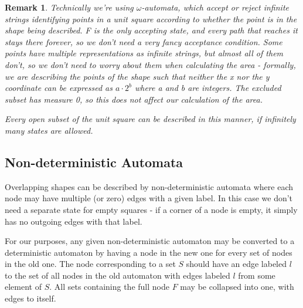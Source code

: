 \documentclass{article}
\newtheorem*{remark}{Remark}
\begin{document}
\begin{remark}
	Technically we're using $\omega$-automata, which accept or reject infinite strings identifying points in a unit square according to whether the point is in the shape being described.
	F is the only accepting state, and every path that reaches it stays there forever, so we don't need a very fancy acceptance condition.
	Some points have multiple representations as infinite strings, but almost all of them don't, so we don't need to worry about them when calculating the area - formally, we are describing the points of the shape such that neither the x nor the y coordinate can be expressed as $a \cdotp 2^b$ where a and b are integers. The excluded subset has measure 0, so this does not affect our calculation of the area.
	
	Every open subset of the unit square can be described in this manner, if infinitely many states are allowed.
\end{remark}

\subsection{Non-deterministic Automata}
Overlapping shapes can be described by non-deterministic automata where each node may have multiple (or zero) edges with a given label. In this case we don't need a separate state for empty squares - if a corner of a node is empty, it simply has no outgoing edges with that label.

For our purposes, any given non-deterministic automaton may be converted to a deterministic automaton by having a node in the new one for every set of nodes in the old one. The node corresponding to a set $S$ should have an edge labeled $l$ to the set of all nodes in the old automaton with edges labeled $l$ from some element of $S$. All sets containing the full node $F$ may be collapsed into one, with edges to itself.

\label{sec:automaton}
\end{document}
